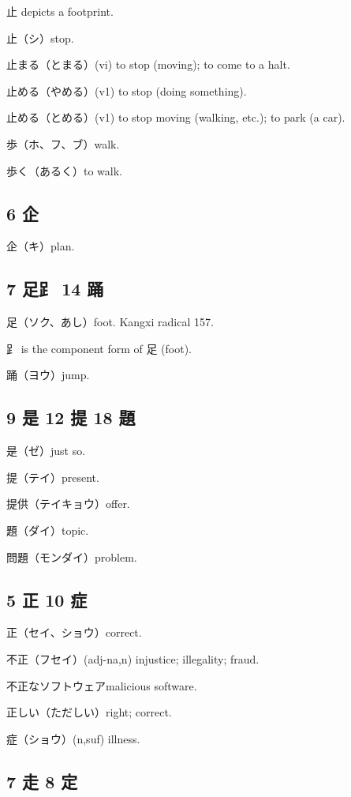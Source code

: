 止 depicts a footprint.

止（シ）stop.

止まる（とまる）(vi) to stop (moving); to come to a halt.

止める（やめる）(v1) to stop (doing something).

止める（とめる）(v1) to stop moving (walking, etc.); to park (a car).

歩（ホ、フ、ブ）walk.

歩く（あるく）to walk.

\subsection{6 企}

企（キ）plan.

\subsection{7 足⻊ 14 踊}

足（ソク、あし）foot.
Kangxi radical 157.

⻊ is the component form of 足 (foot).

踊（ヨウ）jump.

\subsection{9 是 12 提 18 題}

是（ゼ）just so.

提（テイ）present.

提供（テイキョウ）offer.

題（ダイ）topic.

問題（モンダイ）problem.

\subsection{5 正 10 症}

正（セイ、ショウ）correct.

不正（フセイ）(adj-na,n) injustice; illegality; fraud.

不正なソフトウェアmalicious software.

正しい（ただしい）right; correct.

症（ショウ）(n,suf) illness.

\subsection{7 走 8 定}

